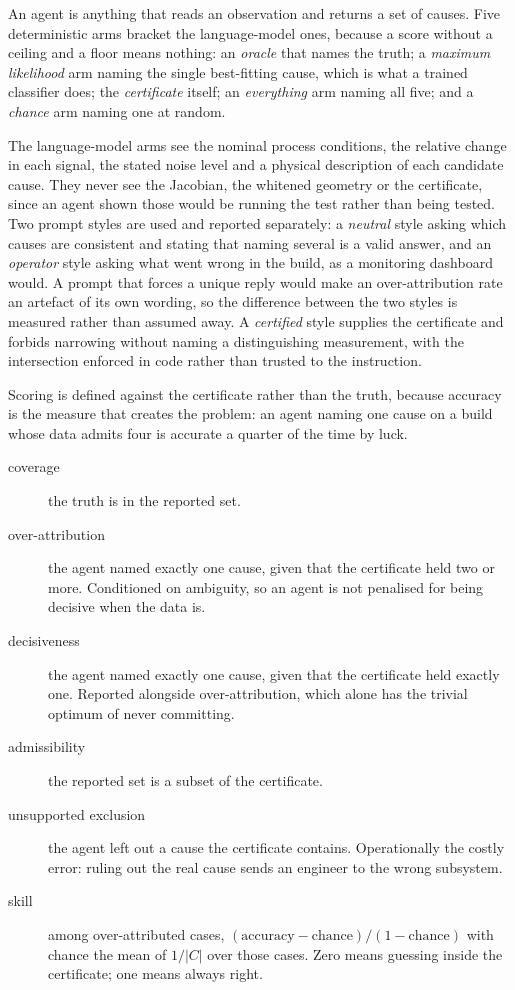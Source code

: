 \documentclass[preprint,12pt]{elsarticle}
\begin{document}
An agent is anything that reads an observation and returns a set of causes. Five
deterministic arms bracket the language-model ones, because a score without a
ceiling and a floor means nothing: an \emph{oracle} that names the truth; a
\emph{maximum likelihood} arm naming the single best-fitting cause, which is
what a trained classifier does; the \emph{certificate} itself; an
\emph{everything} arm naming all five; and a \emph{chance} arm naming one at
random.

The language-model arms see the nominal process conditions, the relative change
in each signal, the stated noise level and a physical description of each
candidate cause. They never see the Jacobian, the whitened geometry or the
certificate, since an agent shown those would be running the test rather than
being tested. Two prompt styles are used and reported separately: a
\emph{neutral} style asking which causes are consistent and stating that naming
several is a valid answer, and an \emph{operator} style asking what went wrong
in the build, as a monitoring dashboard would. A prompt that forces a unique
reply would make an over-attribution rate an artefact of its own wording, so the
difference between the two styles is measured rather than assumed away. A
\emph{certified} style supplies the certificate and forbids narrowing without
naming a distinguishing measurement, with the intersection enforced in code
rather than trusted to the instruction.

Scoring is defined against the certificate rather than the truth, because
accuracy is the measure that creates the problem: an agent naming one cause on a
build whose data admits four is accurate a quarter of the time by luck.

\begin{description}
\item[coverage] the truth is in the reported set.
\item[over-attribution] the agent named exactly one cause, given that the
certificate held two or more. Conditioned on ambiguity, so an agent is not
penalised for being decisive when the data is.
\item[decisiveness] the agent named exactly one cause, given that the
certificate held exactly one. Reported alongside over-attribution, which alone
has the trivial optimum of never committing.
\item[admissibility] the reported set is a subset of the certificate.
\item[unsupported exclusion] the agent left out a cause the certificate
contains. Operationally the costly error: ruling out the real cause sends an
engineer to the wrong subsystem.
\item[skill] among over-attributed cases, $(\text{accuracy} - \text{chance})/
(1 - \text{chance})$ with chance the mean of $1/|C|$ over those cases. Zero
means guessing inside the certificate; one means always right.
\end{description}
\end{document}
